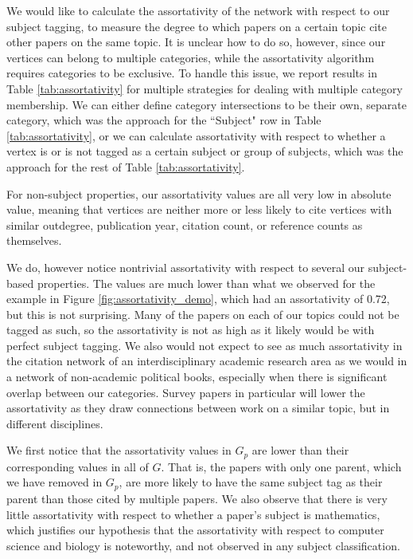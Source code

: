 \documentclass[12pt]{thesis}
\theoremstyle{plain}
\theoremstyle{definition}
\theoremstyle{remark}
\begin{document}
We would like to calculate the assortativity of the network with respect to our subject tagging, to measure the degree to which papers on a certain topic cite other papers on the same topic. It is unclear how to do so, however, since our vertices can belong to multiple categories, while the assortativity algorithm requires categories to be exclusive. To handle this issue, we report results in Table \ref{tab:assortativity} for multiple strategies for dealing with multiple category membership. We can either define category intersections to be their own, separate category, which was the approach for the ``Subject" row in Table \ref{tab:assortativity}, or we can calculate assortativity with respect to whether a vertex is or is not tagged as a certain subject or group of subjects, which was the approach for the rest of Table \ref{tab:assortativity}.

For non-subject properties, our assortativity values are all very low in absolute value, meaning that vertices are neither more or less likely to cite vertices with similar outdegree, publication year, citation count, or reference counts as themselves.

We do, however notice nontrivial assortativity with respect to several our subject-based properties. The values are much lower than what we observed for the example in Figure \ref{fig:assortativity_demo}, which had an assortativity of 0.72, but this is not surprising. Many of the papers on each of our topics could not be tagged as such, so the assortativity is not as high as it likely would be with perfect subject tagging. We also would not expect to see as much assortativity in the citation network of an interdisciplinary academic research area as we would in a network of non-academic political books, especially when there is significant overlap between our categories. Survey papers in particular will lower the assortativity as they draw connections between work on a similar topic, but in different disciplines.

We first notice that the assortativity values in $G_p$ are lower than their corresponding values in all of $G$. That is, the papers with only one parent, which we have removed in $G_p$, are more likely to have the same subject tag as their parent than those cited by multiple papers. We also observe that there is very little assortativity with respect to whether a paper's subject is mathematics, which justifies our hypothesis that the assortativity with respect to computer science and biology is noteworthy, and not observed in any subject classification.
\end{document}
